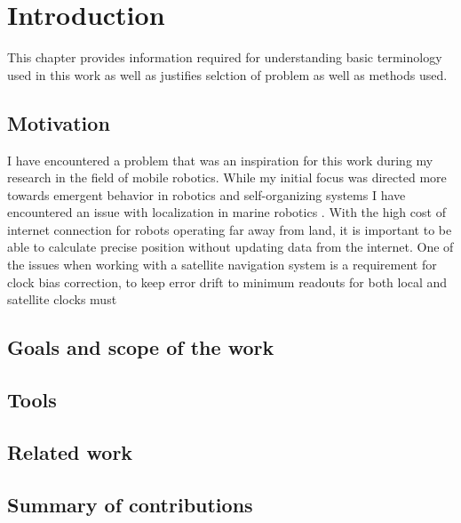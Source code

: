 \chapter{Introduction}
This chapter provides information required for understanding basic terminology used in this
work as well as justifies selction of problem as well as methods used.


\FloatBarrier
\section{Motivation}
I have encountered a problem that was an inspiration for this work during my research in the 
field of mobile robotics.
While my initial focus was directed more towards emergent behavior in robotics and self-organizing 
systems \cite{Gnys2017}\cite{Gnys2019} I have encountered an issue with localization in marine 
robotics \cite{Cabrera-Gamez2014}.
With the high cost of internet connection for robots operating far away from land, 
it is important to be able to calculate precise position without updating data from the internet.
One of the issues when working with a satellite navigation system is a requirement for clock bias
correction, to keep error drift to minimum readouts for both local and satellite clocks must

\FloatBarrier
\section{Goals and scope of the work}

\FloatBarrier
\section{Tools}

\FloatBarrier
\section{Related work}


\FloatBarrier
\section{Summary of contributions}

